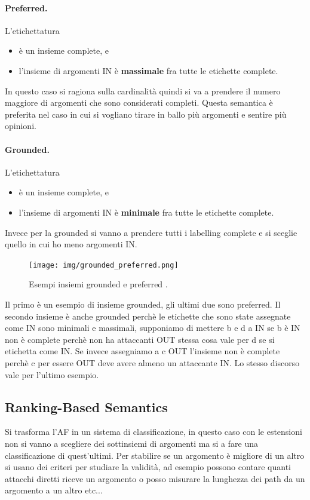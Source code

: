 \paragraph{Preferred.}
L'etichettatura
\begin{itemize}
    \item è un insieme complete, e 
    \item l'insieme di argomenti IN è \textbf{massimale} fra tutte le etichette complete.
\end{itemize}
In questo caso si ragiona sulla cardinalità quindi si va a prendere il numero maggiore di argomenti che sono considerati completi. Questa semantica è preferita nel caso in cui si vogliano tirare in ballo più argomenti e sentire più opinioni.

\paragraph{Grounded.}
L'etichettatura
\begin{itemize}
    \item è un insieme complete, e 
    \item l'insieme di argomenti IN è \textbf{minimale} fra tutte le etichette complete.
\end{itemize}
Invece per la grounded si vanno a prendere tutti i labelling complete e si sceglie quello in cui ho meno argomenti IN.

\begin{figure}[H]
    \centering
    \texttt{[image: img/grounded\_preferred.png]}
    \caption{Esempi insiemi grounded e preferred .}\label{fig:es_grounded_preferred}
\end{figure}
Il primo è un esempio di insieme grounded, gli ultimi due sono preferred. Il secondo insieme è anche grounded perchè le etichette che sono state assegnate come IN sono minimali e massimali, supponiamo di mettere b e d a IN se b è IN non è complete perchè non ha attaccanti OUT stessa cosa vale per d se si etichetta come IN. Se invece assegniamo a c OUT l'insieme non è complete perchè c per essere OUT deve avere almeno un attaccante IN. Lo stesso discorso vale per l'ultimo esempio.
\subsection{Ranking-Based Semantics}
Si trasforma l'AF in un sistema di classificazione, in questo caso con le estensioni non si vanno a scegliere dei sottinsiemi di argomenti ma si a fare una classificazione di quest'ultimi. Per stabilire se un argomento è migliore di un altro si usano dei criteri per studiare la validità, ad esempio possono contare quanti attacchi diretti riceve un argomento o posso misurare la lunghezza dei path da un argomento a un altro etc... 


